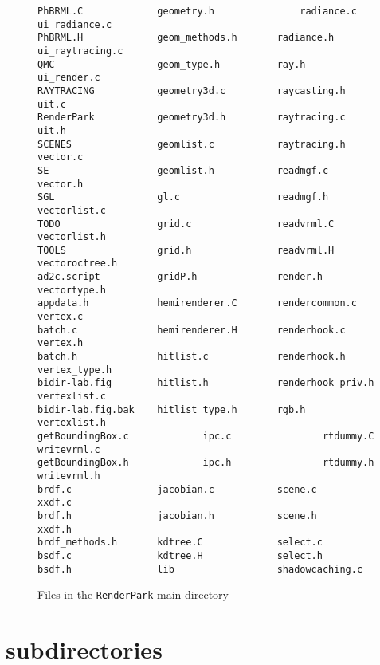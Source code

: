 \documentclass[11pt]{report}
\begin{document}
\begin{figure}
\begin{small}
\begin{verbatim}
PhBRML.C             geometry.h               radiance.c           ui_radiance.c
PhBRML.H             geom_methods.h       radiance.h           ui_raytracing.c
QMC                  geom_type.h          ray.h                ui_render.c
RAYTRACING           geometry3d.c         raycasting.h         uit.c
RenderPark           geometry3d.h         raytracing.c         uit.h
SCENES               geomlist.c           raytracing.h         vector.c
SE                   geomlist.h           readmgf.c            vector.h
SGL                  gl.c                 readmgf.h            vectorlist.c
TODO                 grid.c               readvrml.C           vectorlist.h
TOOLS                grid.h               readvrml.H           vectoroctree.h
ad2c.script          gridP.h              render.h             vectortype.h
appdata.h            hemirenderer.C       rendercommon.c       vertex.c
batch.c              hemirenderer.H       renderhook.c         vertex.h
batch.h              hitlist.c            renderhook.h         vertex_type.h
bidir-lab.fig        hitlist.h            renderhook_priv.h    vertexlist.c
bidir-lab.fig.bak    hitlist_type.h       rgb.h                vertexlist.h
getBoundingBox.c             ipc.c                rtdummy.C            writevrml.c
getBoundingBox.h             ipc.h                rtdummy.h            writevrml.h
brdf.c               jacobian.c           scene.c              xxdf.c
brdf.h               jacobian.h           scene.h              xxdf.h
brdf_methods.h       kdtree.C             select.c
bsdf.c               kdtree.H             select.h
bsdf.h               lib                  shadowcaching.c
\end{verbatim}
\end{small}
\caption{Files in the {\tt RenderPark} main directory}
\label{fig1}
\end{figure}

%

\section{subdirectories}
\end{document}
